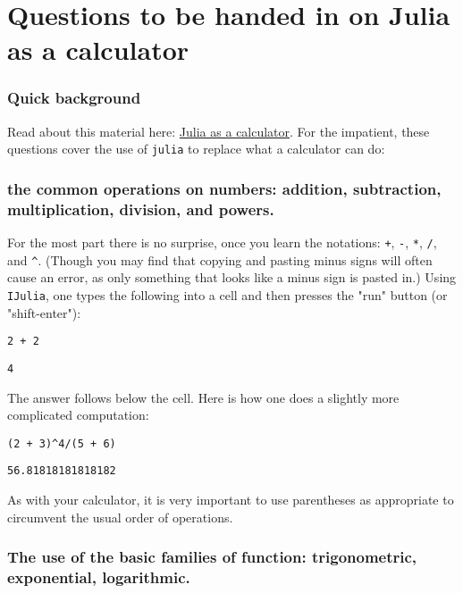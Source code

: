 \documentclass[12pt]{article}
\begin{document}
\section{Questions to be handed in on Julia as a calculator}\subsubsection{Quick background}\newline
Read about this material here: \href{http://mth229.github.io/calculator.html}{Julia as a calculator}.\newline
For the impatient, these questions cover the use of \texttt{julia} to replace what a calculator can do:\subsubsection{the common operations on numbers: addition, subtraction,  multiplication, division, and powers.}\newline
For the most part there is no surprise, once you learn the notations:   \texttt{+}, \texttt{-}, \texttt{*}, \texttt{/}, and \texttt{^}. (Though you may find that copying and   pasting minus signs will often cause an error, as only something   that looks like a minus sign is pasted in.)\newline
Using \texttt{IJulia}, one types the following into a cell and then presses the "run" button (or "shift-enter"):\begin{verbatim}
2 + 2
\end{verbatim}
\begin{verbatim}
4\end{verbatim}
\newline
The answer follows below the cell.\newline
Here is how one does a slightly more complicated computation:\begin{verbatim}
(2 + 3)^4/(5 + 6)
\end{verbatim}
\begin{verbatim}
56.81818181818182\end{verbatim}
\newline
As with your calculator, it is very important to use parentheses as appropriate to circumvent the usual order of operations.\subsubsection{The use of the basic families of function: trigonometric, exponential, logarithmic.}\newline
\end{document}
